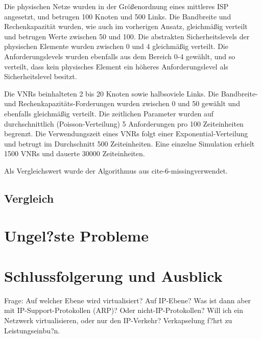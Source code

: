 \documentclass{lni}
\begin{document}
Die physischen Netze wurden in der Größenordnung eines mittleres ISP angesetzt, und betrugen 100 Knoten und 500 Links. Die Bandbreite und Rechenkapazität wurden, wie auch im vorherigen Ansatz, gleichmäßig verteilt und betrugen Werte zwischen 50 und 100. Die abstrakten Sicherheitslevels der physischen Elemente wurden zwischen 0 und 4 gleichmäßig verteilt. Die Anforderungslevels wurden ebenfalls aus dem Bereich 0-4 gewählt, und so verteilt, dass kein physisches Element ein höheres Anforderungslevel als Sicherheitslevel besitzt.

Die VNRs beinhalteten 2 bis 20 Knoten sowie halbsoviele Links. Die Bandbreite- und Rechenkapazitäts-Forderungen wurden zwischen 0 und 50 gewählt und ebenfalls gleichmäßig verteilt.
Die zeitlichen Parameter wurden auf durchschnittlich (Poisson-Verteilung) 5 Anforderungen pro 100 Zeiteinheiten begrenzt. Die Verwendungszeit eines VNRs folgt einer Exponential-Verteilung und betrugt im Durchschnitt 500 Zeiteinheiten. Eine einzelne Simulation erhielt 1500 VNRs und dauerte 30000 Zeiteinheiten.

Als Vergleichswert wurde der Algorithmus aus cite-6-missingverwendet.




\subsection{Vergleich}
\label{subsec:svne_vergleich}



\section{Ungel?ste Probleme}
\label{sec:offenefragen}

\section{Schlussfolgerung und Ausblick}
\label{sec:schluss}
Frage: Auf welcher Ebene wird virtualisiert? Auf IP-Ebene? Was ist dann aber mit IP-Support-Protokollen (ARP)? Oder nicht-IP-Protokollen? Will ich ein Netzwerk virtualisieren, oder nur den IP-Verkehr? Verkapselung f?hrt zu Leistungseinbu?n. \cite{cabuk2007towards}



{}
\end{document}
